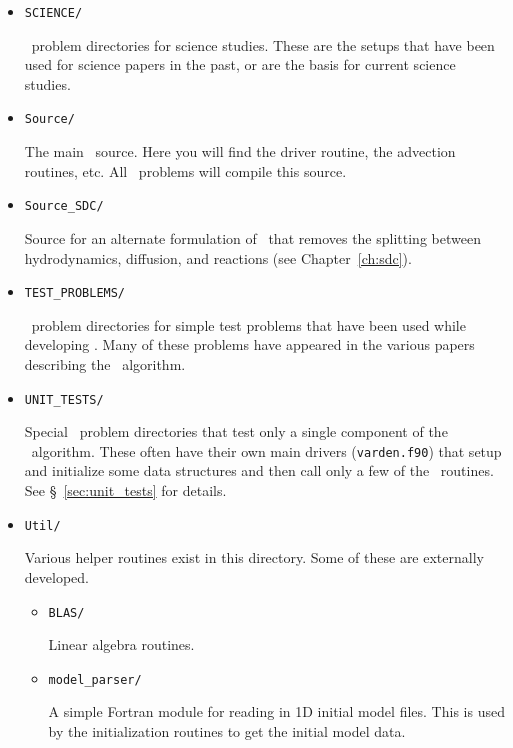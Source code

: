 \begin{itemize}
\begin{itemize}
\begin{itemize}
    \end{itemize}

  \item {\tt SCIENCE/}

    \maestro\ problem directories for science studies.  These are the
    setups that have been used for science papers in the past, or are
    the basis for current science studies.

  \item {\tt Source/}

    The main \maestro\ source.  Here you will find the driver routine,
    the advection routines, etc.  All \maestro\ problems will compile
    this source.

  \item {\tt Source\_SDC/}

    Source for an alternate formulation of \maestro\ that removes the
    splitting between hydrodynamics, diffusion, and reactions (see
    Chapter~\ref{ch:sdc}).

  \item {\tt TEST\_PROBLEMS/}
 
    \maestro\ problem directories for simple test problems that have
    been used while developing \maestro.  Many of these problems have
    appeared in the various papers describing the \maestro\ algorithm.

  \item {\tt UNIT\_TESTS/}

    Special \maestro\ problem directories that test only a single component
    of the \maestro\ algorithm.  These often have their own main drivers
    ({\tt varden.f90}) that setup and initialize some data structures and
    then call only a few of the \maestro\ routines.  See \S~\ref{sec:unit_tests}
    for details.

  \item {\tt Util/}

    Various helper routines exist in this directory.  Some of these
    are externally developed.

    \begin{itemize}

    \item {\tt BLAS/}

      Linear algebra routines.

    \item {\tt model\_parser/}

      A simple Fortran module for reading in 1D initial model files.
      This is used by the initialization routines to get the initial
      model data.


\end{itemize}
\end{itemize}
\end{itemize}
